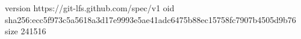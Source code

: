 version https://git-lfs.github.com/spec/v1
oid sha256:ecc5f973c5a5618a3d17e9993e5ae41adc6475b88ec15758fc7907b4505d9b76
size 241516
